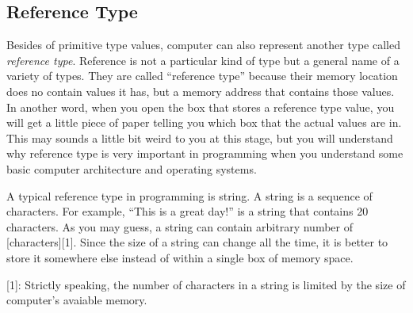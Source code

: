 \documentclass[../main.tex]{subfiles}
\begin{document}
\subsection{Reference Type}
Besides of primitive type values, computer can also represent another type
called \emph{reference type}. Reference is not a particular kind of type but a
general name of a variety of types. They are called ``reference type'' because
their memory location does no contain values it has, but a memory address that
contains those values. In another word, when you open the box that stores a
reference type value, you will get a little piece of paper telling you which
box that the actual values are in. This may sounds a little bit weird to you at
this stage, but you will understand why reference type is very important in
programming when you understand some basic computer architecture and operating
systems.

A typical reference type in programming is string. A string is a sequence of
characters. For example, ``This is a great day!'' is a string that contains 20
characters. As you may guess, a string can contain arbitrary number of
[characters][1]. Since the size of a string can change all the time, it is
better to store it somewhere else instead of within a single box of memory space.

[1]: Strictly speaking, the number of characters in a string is limited by the
size of computer's avaiable memory.
\end{document}
